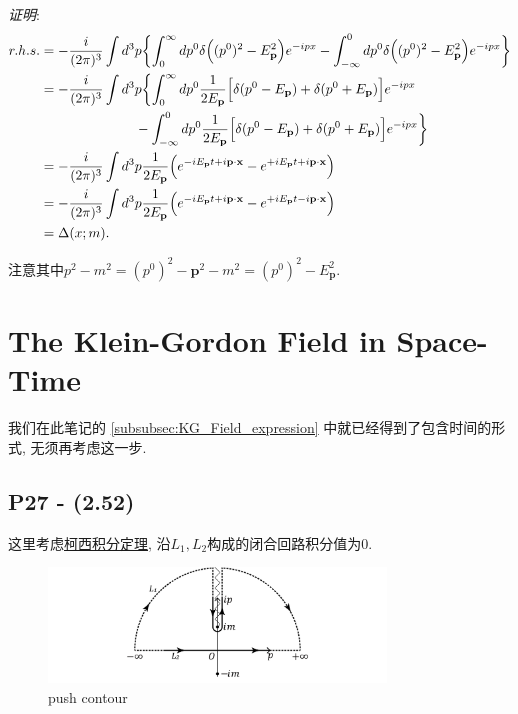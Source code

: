 \documentclass[10pt,b5paper,openany]{book}
\begin{document}
\textit{证明}: 
\begin{equation}
  \begin{aligned}
    r. h. s. &= -\frac{i}{(2\pi)^3}\int d^3 p \biggl\{ \int_{0}^{\infty}dp^0\delta\Bigl((p^0)^2 - E_\mathbf{p}^2\Bigr)e^{-ipx} - \int_{-\infty}^{0}dp^0\delta\Bigl((p^0)^2 - E_\mathbf{p}^2\Bigr)e^{-ipx} \biggr\} \\
              &= -\frac{i}{(2\pi)^3}\int d^3 p \biggl\{ \int_{0}^{\infty}dp^0\frac{1}{2E_\mathbf{p}}\Bigl[\delta(p^0 - E_\mathbf{p}) + \delta(p^0 + E_\mathbf{p}) \Bigr]e^{-ipx} \\
              &\qquad \qquad \qquad \quad - 
              \int_{-\infty}^{0}dp^0\frac{1}{2E_\mathbf{p}}\Bigl[\delta(p^0 - E_\mathbf{p}) + \delta(p^0 + E_\mathbf{p}) \Bigr]e^{-ipx}\biggr\} \\
              &= -\frac{i}{(2\pi)^3} \int d^3 p \frac{1}{2E_\mathbf{p}} \Bigl(e^{-iE_\mathbf{p} t + i \mathbf{p} \cdot \mathbf{x}} - e^{+iE_\mathbf{p} t + i \mathbf{p} \cdot \mathbf{x}}\Bigr) \\ 
              &= -\frac{i}{(2\pi)^3} \int d^3 p \frac{1}{2E_\mathbf{p}} \Bigl(e^{-iE_\mathbf{p} t + i \mathbf{p} \cdot \mathbf{x}} - e^{+iE_\mathbf{p} t - i \mathbf{p} \cdot \mathbf{x}}\Bigr) \\
              &= \Delta(x; m). 
  \end{aligned}
\end{equation}

注意其中$p^2 - m^2 = (p^0)^2 - \mathbf{p}^2 - m^2 = (p^0)^2 - E_\mathbf{p}^2$. 

\section{The Klein-Gordon Field in Space-Time}

我们在此笔记的 \ref{subsubsec:KG_Field_expression} 中就已经得到了包含时间的形式, 无须再考虑这一步. 

\subsection{P27 - (2.52)}
这里考虑\href{https://zh.wikipedia.org/wiki/柯西积分定理}{柯西积分定理}, 
沿$L_1, L_2$构成的闭合回路积分值为0. 

\begin{figure}[htbp]
  \centering
  \includegraphics[width = 0.8\textwidth]{P27_2.52.png}
  \caption{push contour}
  \label{fig: pushcon}
\end{figure}
\end{document}

